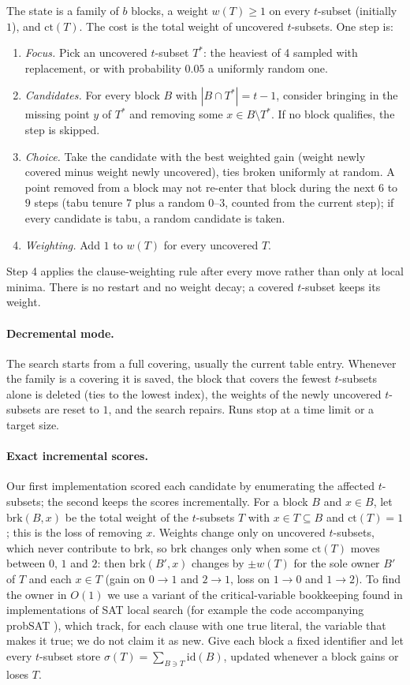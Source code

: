 \documentclass[11pt]{article}
\theoremstyle{remark}
\newcommand{\cov}{\mathrm{ct}}
\begin{document}
The state is a family of $b$ blocks, a weight $w(T)\ge 1$ on every $t$-subset (initially $1$), and $\cov(T)$. The
cost is the total weight of uncovered $t$-subsets. One step is:
\begin{enumerate}
\item \emph{Focus.} Pick an uncovered $t$-subset $T^\ast$: the heaviest of 4 sampled with replacement, or with
probability $0.05$ a uniformly random one.
\item \emph{Candidates.} For every block $B$ with $|B\cap T^\ast|=t-1$, consider bringing in the missing point $y$ of
$T^\ast$ and removing some $x\in B\setminus T^\ast$. If no block qualifies, the step is skipped.
\item \emph{Choice.} Take the candidate with the best weighted gain (weight newly covered minus weight newly
uncovered), ties broken uniformly at random. A point removed from a block may not re-enter that block during the next $6$
to $9$ steps (tabu tenure $7$ plus a random $0$--$3$, counted from the current step); if every candidate is tabu, a random candidate is taken.
\item \emph{Weighting.} Add $1$ to $w(T)$ for every uncovered $T$.
\end{enumerate}
Step 4 applies the clause-weighting rule after every move rather than only at local minima. There is no restart and
no weight decay; a covered $t$-subset keeps its weight.

\paragraph{Decremental mode.} The search starts from a full covering, usually the current table entry. Whenever the
family is a covering it is saved, the block that covers the fewest $t$-subsets alone is deleted (ties to the lowest
index), the weights of the newly uncovered $t$-subsets are reset to $1$, and the search repairs. Runs stop at a time
limit or a target size.

\paragraph{Exact incremental scores.} Our first implementation scored each candidate by enumerating the affected
$t$-subsets; the second keeps the scores incrementally. For a block $B$ and $x\in B$, let $\mathrm{brk}(B,x)$ be the
total weight of the $t$-subsets $T$ with $x\in T\subseteq B$ and $\cov(T)=1$; this is the loss of removing $x$.
Weights change only on uncovered $t$-subsets, which never contribute to brk, so brk changes only when some $\cov(T)$
moves between $0$, $1$ and $2$: then $\mathrm{brk}(B',x)$ changes by $\pm w(T)$ for the sole owner $B'$ of $T$ and
each $x\in T$ (gain on $0\to 1$ and $2\to 1$, loss on $1\to 0$ and $1\to 2$). To find the owner in $O(1)$ we use a variant of the
critical-variable bookkeeping found in implementations of SAT local search (for example the code accompanying
probSAT \cite{probsat2012}), which track, for each clause with one true literal, the variable that makes it true; we
do not claim it as new. Give each
block a fixed identifier and let every $t$-subset store $\sigma(T)=\sum_{B\ni T}\mathrm{id}(B)$, updated whenever a
block gains or loses $T$.
\end{document}
